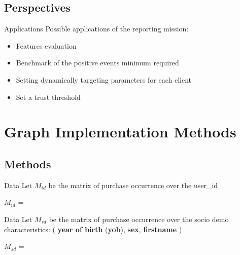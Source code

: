 \documentclass[pdf]{beamer}
\begin{document}
\subsection{Perspectives}

\begin{frame}{Applications}
Possible applications of the reporting mission:
\begin{itemize}
\item{Features evaluation}
\item{Benchmark of the positive events minimum required}
\item{Setting dynamically targeting parameters for each client}
\item{Set a trust threshold}
\end{itemize}
\end{frame}

\section{Graph Implementation Methods}
\subsection{Methods}


\begin{frame}{Data}
Let $M_{id}$ be the matrix of purchase occurrence over the user\_id

\vspace{0.6cm}

$ M_{id} $ =  
                  
\end{frame}


\begin{frame}{Data}
Let $M_{sd}$ be the matrix of purchase occurrence over the socio demo characteristics: ( \textbf{year of birth} (\textbf{yob}), \textbf{sex}, \textbf{firstname} )

\vspace{0.6cm}

$ M_{sd} $ =  
                  
\end{frame}
\end{document}
